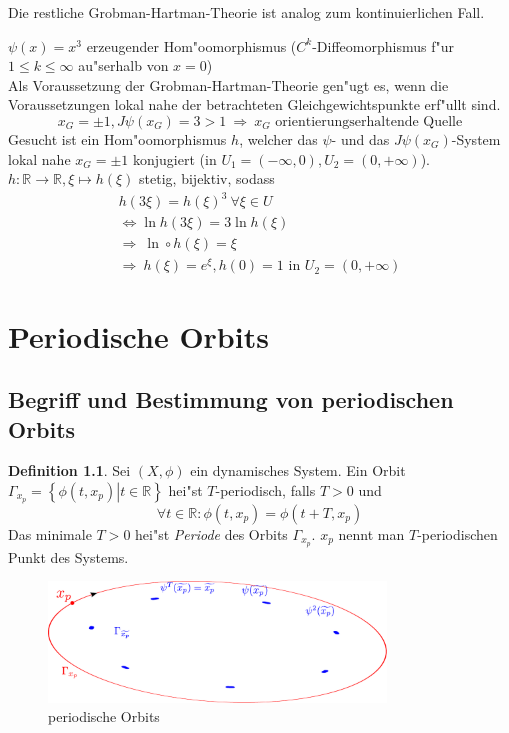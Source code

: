 \documentclass[a4paper, 13pt]{scrreprt}
\theoremstyle{definition} \newtheorem{definition}{Definition}[section]
\newenvironment{beispiel}[1][Beispiel]{\begin{trivlist}
\item[\hskip \labelsep {\bfseries #1}]}{\end{trivlist}}
\newcommand{\RR}{\mathbb{R}}
\begin{document}
Die restliche Grobman-Hartman-Theorie ist analog zum kontinuierlichen Fall.

\begin{beispiel}
$\psi(x)=x^3$ erzeugender Hom"oomorphismus ($C^k$-Diffeomorphismus f"ur $1\leq k\leq\infty$ au"serhalb von $x=0$)\\
Als Voraussetzung der Grobman-Hartman-Theorie gen"ugt es, wenn die Voraussetzungen lokal nahe der betrachteten Gleichgewichtspunkte erf"ullt sind.
\[x_G=\pm 1, J\psi(x_G)=3>1\ \Rightarrow\ x_G\text{ orientierungserhaltende Quelle}\]
Gesucht ist ein Hom"oomorphismus $h$, welcher das $\psi$- und das $J\psi(x_G)$-System lokal nahe $x_G=\pm 1$ konjugiert (in $U_1=(-\infty, 0), U_2=(0,+\infty)$).\\
$h:\mathbb{R}\to\mathbb{R}, \xi\mapsto h(\xi)$ stetig, bijektiv, sodass
\begin{align*}
h(3\xi)=h(\xi)^3\ \forall\xi\in U\\
\Leftrightarrow \ln h(3\xi)=3\ln h(\xi)\\
\Rightarrow\ \ln\circ h(\xi)=\xi\\
\Rightarrow\ h(\xi)=e^{\xi}, h(0)=1 \text{ in } U_2=(0,+\infty)
\end{align*}
\end{beispiel}

\chapter{Periodische Orbits}
\section{Begriff und Bestimmung von periodischen Orbits}
\begin{definition}
Sei $(X,\phi)$ ein dynamisches System. Ein Orbit $\Gamma_{x_p} = \left \{ \left. \phi(t, x_p) \right | t \in \RR \right \}$ hei"st $T$-periodisch, falls $T>0$ und 
$$\forall t \in \RR: \phi(t, x_p) = \phi(t + T, x_p)$$
Das minimale $T>0$ hei"st \emph{Periode} des Orbits $\Gamma_{x_p}$. $x_p$ nennt man $T$-periodischen Punkt des Systems.
\end{definition}
\begin{figure}[htpb]
		\centering
		\includegraphics[width=0.8\textwidth]{img/periodische_orbits/disk_kont.pdf}
		\caption{periodische Orbits}
\end{figure}
\end{document}
